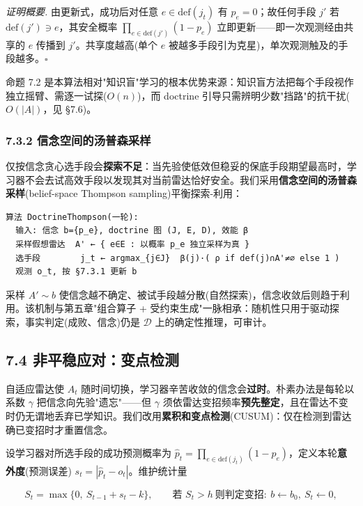 \documentclass[12pt,a4paper]{ctexart}
\begin{document}
\textit{证明概要.} 由更新式，成功后对任意 $e\in\mathrm{def}(j_t)$ 有 $p_e=0$；故任何手段 $j'$ 若 $\mathrm{def}(j')\ni e$，其安全概率 $\prod_{e\in\mathrm{def}(j')}(1-p_e)$ 立即更新——即一次观测经由共享的 $e$ 传播到 $j'$。共享度越高(单个 $e$ 被越多手段引为克星)，单次观测触及的手段越多。$\square$

命题 7.2 是本算法相对"知识盲"学习的根本优势来源：知识盲方法把每个手段视作独立摇臂、需逐一试探($O(n)$)，而 doctrine 引导只需辨明少数"挡路"的抗干扰($O(|A|)$，见 §7.6)。

\subsubsection*{7.3.2 信念空间的汤普森采样}

仅按信念贪心选手段会\textbf{探索不足}：当先验使低效但稳妥的保底手段期望最高时，学习器不会去试高效手段以发现其对当前雷达恰好安全。我们采用\textbf{信念空间的汤普森采样}(belief-space Thompson sampling)平衡探索-利用：

\begin{Verbatim}
算法 DoctrineThompson(一轮):
  输入: 信念 b={p_e}, doctrine 图 (J, E, D), 效能 β
  采样假想雷达  A' ← { e∈E : 以概率 p_e 独立采样为真 }
  选手段        j_t ← argmax_{j∈J}  β(j)·( ρ if def(j)∩A'≠∅ else 1 )
  观测 o_t, 按 §7.3.1 更新 b
\end{Verbatim}

采样 $A'\sim b$ 使信念越不确定、被试手段越分散(自然探索)，信念收敛后则趋于利用。该机制与第五章"组合算子 + 受约束生成"一脉相承：随机性只用于驱动探索，事实判定(成败、信念)仍是 $\mathcal{D}$ 上的确定性推理，可审计。


\subsection*{7.4 非平稳应对：变点检测}

自适应雷达使 $A_t$ 随时间切换，学习器辛苦收敛的信念会\textbf{过时}。朴素办法是每轮以系数 $\gamma$ 把信念向先验"遗忘"——但 $\gamma$ 须依雷达变招频率\textbf{预先整定}，且在雷达不变时仍无谓地丢弃已学知识。我们改用\textbf{累积和变点检测}(CUSUM)：仅在检测到雷达确已变招时才重置信念。

设学习器对所选手段的成功预测概率为 $\hat p_t=\prod_{e\in\mathrm{def}(j_t)}(1-p_e)$，定义本轮\textbf{意外度}(预测误差) $s_t=|\hat p_t-o_t|$。维护统计量

\[S_t=\max\{0,\ S_{t-1}+s_t-k\},\qquad \text{若 } S_t>h\ \text{则判定变招}:\ b\leftarrow b_0,\ S_t\leftarrow 0,\]
\end{document}
